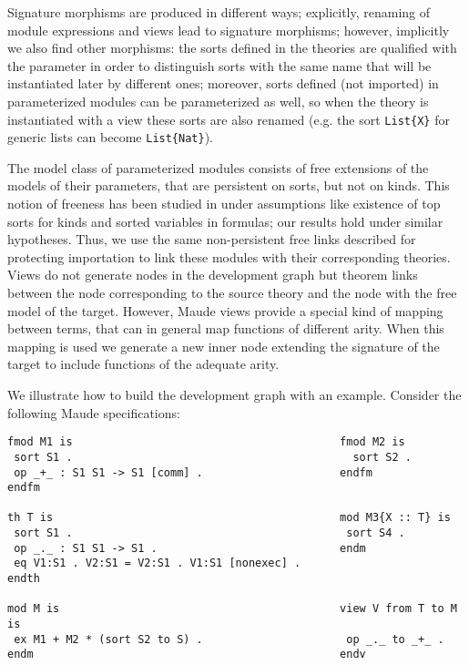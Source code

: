 
Signature morphisms are produced in different ways; explicitly, 
renaming of module expressions and  views lead to signature
morphisms; however, implicitly we also find other morphisms:
the sorts defined in the theories are qualified
with the parameter in order to distinguish sorts with the same name that
will be instantiated later by different ones; moreover, sorts defined
(not imported) in parameterized modules can be parameterized as well,
so when the theory is instantiated with a view these sorts are also
renamed (e.g. the sort \verb"List{X}" for generic lists can become
\verb"List{Nat}").

The model class of parameterized modules
consists of free extensions of the models of their parameters, that are
persistent on sorts, but not on kinds. This notion of freeness has been 
studied in \cite{BouhoulaJM00} under assumptions like existence of top sorts for kinds
and sorted variables in formulas; our results hold under similar
hypotheses. Thus,
we use the same non-persistent free links described for protecting
importation to link these modules with their corresponding theories.
%
%
%
Views do not generate nodes in the development graph but theorem links
between the node corresponding to the source theory and the node with
the free model of the target. However, Maude views
provide a special kind of mapping between terms, that can in general
map functions of different arity. When this mapping is used we generate
a new inner node extending the signature of the target to include functions
of the adequate arity.

We illustrate how to build the development graph with an example. Consider
the following Maude specifications:

{\codesize
\begin{verbatim}
fmod M1 is                                         fmod M2 is
 sort S1 .                                           sort S2 .
 op _+_ : S1 S1 -> S1 [comm] .                     endfm
endfm

th T is                                            mod M3{X :: T} is
 sort S1 .                                          sort S4 .
 op _._ : S1 S1 -> S1 .                            endm
 eq V1:S1 . V2:S1 = V2:S1 . V1:S1 [nonexec] . 
endth

mod M is                                           view V from T to M is
 ex M1 + M2 * (sort S2 to S) .                      op _._ to _+_ .
endm                                               endv
\end{verbatim}
}

